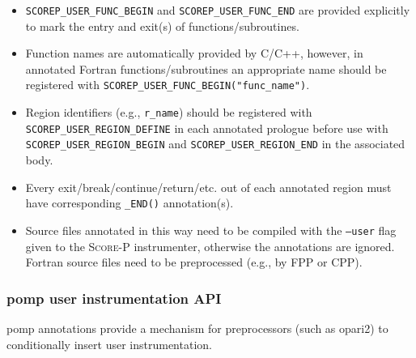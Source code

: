 \documentclass[a4paper]{article}
\newcommand{\Scorep}{\textsc{Score-P}\xspace}
\begin{document}
\begin{itemize}
  \item \texttt{SCOREP\_USER\_FUNC\_BEGIN} and \texttt{SCOREP\_USER\_FUNC\_END} are
provided explicitly to mark the entry and exit(s) of functions/subroutines.
  \item Function names are automatically provided by C/C++, however, in
annotated Fortran functions/subroutines an appropriate name should be
registered with \texttt{SCOREP\_USER\_FUNC\_BEGIN("func\_name")}.
  \item Region identifiers (e.g., \texttt{r\_name}) should be registered
with \texttt{SCOREP\_USER\_REGION\_DEFINE} in each annotated prologue before use with
\texttt{SCOREP\_USER\_REGION\_BEGIN} and \texttt{SCOREP\_USER\_REGION\_END} in the associated body.
  \item Every exit/break/continue/return/etc.{} out of each annotated region
must have corresponding \texttt{\_END()} annotation(s).
  \item Source files annotated in this way need to be compiled with the
\texttt{--user} flag given to the \Scorep instrumenter, otherwise the
annotations are ignored. Fortran source files need to be preprocessed
(e.g., by FPP or CPP).
\end{itemize}

\subsubsection*{{\sc pomp} user instrumentation API}
\label{sec:pomp_inst}
 
{\sc pomp} annotations provide a mechanism for preprocessors (such as
{\sc opari2}) to conditionally insert user instrumentation.
\end{document}
